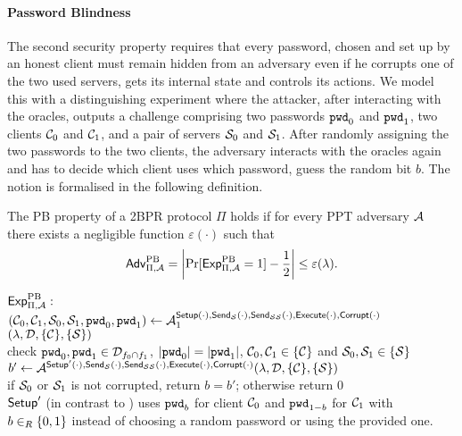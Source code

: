 \paragraph{Password Blindness}
The second security property requires that every password, chosen and set up by an honest client must remain hidden from an adversary even if he corrupts one of the two used servers, gets its internal state and controls its actions.
We model this with a distinguishing experiment where the attacker, after interacting with the oracles, outputs a challenge comprising two passwords $\mathtt{pwd}_0$ and $\mathtt{pwd}_1$, two clients $\mathcal{C}_0$ and $\mathcal{C}_1$, and a pair of servers $\mathcal{S}_0$ and $\mathcal{S}_1$.
After randomly assigning the two passwords to the two clients, the adversary interacts with the oracles again and has to decide which client uses which password, \ie guess the random bit $b$.
The notion is formalised in the following definition.

\begin{definition}\label{def:zk}
The \acl{PB} property of a \ac{2BPR} protocol $\Pi$ holds if for every \ac{PPT} adversary $\mathcal{A}$ there exists a negligible function $\varepsilon(\cdot)$ such that
\[ \mathsf{Adv}_{\Pi, \mathcal{A}}^{\mathrm{PB}}=\left|\Pr[\mathsf{Exp}_{\Pi, \mathcal{A}}^{\mathrm{PB}}=1]-\frac{1}{2}\right|\leq\varepsilon(\lambda). \]

\noindent
$\mathsf{Exp}_{\Pi, \mathcal{A}}^{\mathrm{PB}}:$ \\
\hspace*{2em} $(\mathcal{C}_0, \mathcal{C}_1, \mathcal{S}_0,\mathcal{S}_1,\mathtt{pwd}_0,\mathtt{pwd}_1)\gets\mathcal{A}_1^{\mathsf{Setup}(\cdot),\mathsf{Send}_\mathcal{S}(\cdot),\mathsf{Send}_{\mathcal{S}\mathcal{S}}(\cdot), \mathsf{Execute}(\cdot),\mathsf{Corrupt}(\cdot)}$ $(\lambda,\mathcal{D},\{\mathcal{C}\},\{\mathcal{S}\})$ \\
\hspace*{2em} check $\mathtt{pwd}_0,\mathtt{pwd}_1\in\mathcal{D}_{f_0\cap f_1}$, $|\mathtt{pwd}_0|=|\mathtt{pwd}_1|$, $\mathcal{C}_0,\mathcal{C}_1\in\{\mathcal{C}\}$ and $\mathcal{S}_0,\mathcal{S}_1\in\{\mathcal{S}\}$\\
\hspace*{2em} $ b'\gets\mathcal{A}^{\mathsf{Setup}'(\cdot),\mathsf{Send}_\mathcal{S}(\cdot),\mathsf{Send}_{\mathcal{S}\mathcal{S}}(\cdot), \mathsf{Execute}(\cdot),\mathsf{Corrupt}(\cdot)}(\lambda,\mathcal{D},\{\mathcal{C}\},\{\mathcal{S}\})$\\
\hspace*{2em} if $\mathcal{S}_0$ or $\mathcal{S}_1$ is not corrupted, return $b=b'$; otherwise return $0$ \\

\noindent
$\mathsf{Setup}'$ (in contrast to \Setup) uses $\mathtt{pwd}_b$ for client $\mathcal{C}_0$ and $\mathtt{pwd}_{1-b}$ for $\mathcal{C}_1$ with $b\in_R\{0,1\}$ instead of choosing a random password or using the provided one.
\eod
\end{definition}



